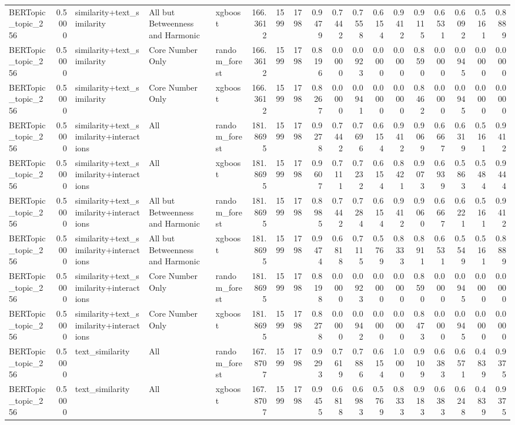 \begin{tabular}{lrlllrrrrrrrrrrrrr}
BERTopic_topic_256 & 0.5000 & similarity+text_similarity & All but Betweenness and Harmonic & xgboost & 166.3612 & 1599 & 1798 & 0.9479 & 0.7442 & 0.7558 & 0.6154 & 0.9412 & 0.9115 & 0.6531 & 0.6092 & 0.5161 & 0.8889 \\
BERTopic_topic_256 & 0.5000 & similarity+text_similarity & Core Number Only & random_forest & 166.3612 & 1599 & 1798 & 0.8196 & 0.0000 & 0.0923 & 0.0000 & 0.0000 & 0.8590 & 0.0000 & 0.0945 & 0.0000 & 0.0000 \\
BERTopic_topic_256 & 0.5000 & similarity+text_similarity & Core Number Only & xgboost & 166.3612 & 1599 & 1798 & 0.8267 & 0.0000 & 0.0941 & 0.0000 & 0.0000 & 0.8462 & 0.0000 & 0.0945 & 0.0000 & 0.0000 \\
BERTopic_topic_256 & 0.5000 & similarity+text_similarity+interactions & All & random_forest & 181.8695 & 1599 & 1798 & 0.9278 & 0.7442 & 0.7696 & 0.6154 & 0.9412 & 0.9069 & 0.6667 & 0.6319 & 0.5161 & 0.9412 \\
BERTopic_topic_256 & 0.5000 & similarity+text_similarity+interactions & All & xgboost & 181.8695 & 1599 & 1798 & 0.9607 & 0.7111 & 0.7232 & 0.6154 & 0.8421 & 0.9073 & 0.6939 & 0.5863 & 0.5484 & 0.9444 \\
BERTopic_topic_256 & 0.5000 & similarity+text_similarity+interactions & All but Betweenness and Harmonic & random_forest & 181.8695 & 1599 & 1798 & 0.8985 & 0.7442 & 0.7284 & 0.6154 & 0.9412 & 0.9060 & 0.6667 & 0.6221 & 0.5161 & 0.9412 \\
BERTopic_topic_256 & 0.5000 & similarity+text_similarity+interactions & All but Betweenness and Harmonic & xgboost & 181.8695 & 1599 & 1798 & 0.9474 & 0.6818 & 0.7115 & 0.5769 & 0.8333 & 0.8911 & 0.6531 & 0.5549 & 0.5161 & 0.8889 \\
BERTopic_topic_256 & 0.5000 & similarity+text_similarity+interactions & Core Number Only & random_forest & 181.8695 & 1599 & 1798 & 0.8198 & 0.0000 & 0.0923 & 0.0000 & 0.0000 & 0.8590 & 0.0000 & 0.0945 & 0.0000 & 0.0000 \\
BERTopic_topic_256 & 0.5000 & similarity+text_similarity+interactions & Core Number Only & xgboost & 181.8695 & 1599 & 1798 & 0.8278 & 0.0000 & 0.0942 & 0.0000 & 0.0000 & 0.8473 & 0.0000 & 0.0945 & 0.0000 & 0.0000 \\
BERTopic_topic_256 & 0.5000 & text_similarity & All & random_forest & 167.8707 & 1599 & 1798 & 0.9293 & 0.7619 & 0.7886 & 0.6154 & 1.0000 & 0.9109 & 0.6383 & 0.6571 & 0.4839 & 0.9375 \\
BERTopic_topic_256 & 0.5000 & text_similarity & All & xgboost & 167.8707 & 1599 & 1798 & 0.9455 & 0.6818 & 0.6983 & 0.5769 & 0.8333 & 0.9183 & 0.6383 & 0.6248 & 0.4839 & 0.9375 \\

\end{tabular}

